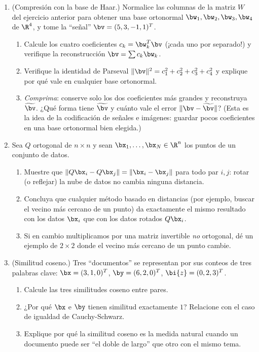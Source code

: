 \begin{enumerate}[leftmargin=*,label=\textbf{\thechapter.\arabic*}]
\item {} (Compresión con la base de Haar.) Normalice las columnas
de la matriz $W$ del ejercicio anterior para obtener una base ortonormal
$\bw_1,\bw_2,\bw_3,\bw_4$ de $\R^4$, y tome la ``señal''
$\bv=(5,3,-1,1)^T$.
\begin{enumerate}[label=(\alph*)]
\item Calcule los cuatro coeficientes $c_k=\bw_k^T\bv$ (¡cada uno por
separado!) y verifique la reconstrucción $\bv=\sum c_k\bw_k$.
\item Verifique la identidad de Parseval $\|\bv\|^2=c_1^2+c_2^2+c_3^2+c_4^2$
y explique por qué vale en cualquier base ortonormal.
\item \emph{Comprima}: conserve solo los dos coeficientes más grandes y
reconstruya $\widetilde{\bv}$. ¿Qué forma tiene $\widetilde{\bv}$ y cuánto
vale el error $\|\bv-\widetilde{\bv}\|$? (Esta es la idea de la codificación
de señales e imágenes: guardar pocos coeficientes en una base ortonormal
bien elegida.)
\end{enumerate}

\item {} Sea $Q$ ortogonal de $n\times n$ y sean
$\bx_1,\dots,\bx_N\in\R^n$ los puntos de un conjunto de datos.
\begin{enumerate}[label=(\alph*)]
\item Muestre que $\|Q\bx_i-Q\bx_j\|=\|\bx_i-\bx_j\|$ para todo par $i,j$:
rotar (o reflejar) la nube de datos no cambia ninguna distancia.
\item Concluya que cualquier método basado en distancias (por ejemplo,
buscar el vecino más cercano de un punto) da exactamente el mismo resultado
con los datos $\bx_i$ que con los datos rotados $Q\bx_i$.
\item Si en cambio multiplicamos por una matriz invertible \emph{no}
ortogonal, dé un ejemplo de $2\times2$ donde el vecino más cercano de un
punto cambie.
\end{enumerate}

\item {} (Similitud coseno.) Tres ``documentos'' se representan
por sus conteos de tres palabras clave:
$\bx=(3,1,0)^T$, $\by=(6,2,0)^T$, $\bi{z}=(0,2,3)^T$.
\begin{enumerate}[label=(\alph*)]
\item Calcule las tres similitudes coseno entre pares.
\item ¿Por qué $\bx$ e $\by$ tienen similitud exactamente $1$? Relacione
con el caso de igualdad de Cauchy-Schwarz.
\item Explique por qué la similitud coseno es la medida natural cuando un
documento puede ser ``el doble de largo'' que otro con el mismo tema.
\end{enumerate}


\end{enumerate}

